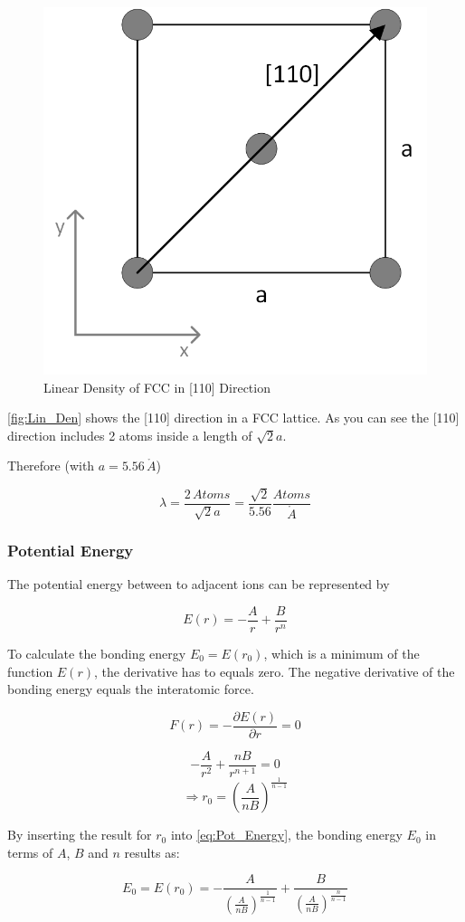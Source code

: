 \begin{figure}[H]
	\centering
	\includegraphics[width=0.5\linewidth]{Graphics/Chapter1/Lin_Den}
	\caption{Linear Density of FCC in [110] Direction}
	\label{fig:Lin_Den}
\end{figure}

\autoref{fig:Lin_Den} shows the [110] direction in a FCC lattice.
As you can see the [110] direction includes 2 atoms inside a 
length of $\sqrt{2}a$.

Therefore  (with $a = 5.56 \, \mathring{A}$)

$$\lambda = \frac{2 \, Atoms}{\sqrt{2}a} = \frac{\sqrt{2}}{5.56} \frac{Atoms}{\mathring{A}}$$

\subsubsection*{Potential Energy}

The potential energy between to adjacent ions can be represented by

\begin{equation}
	E(r) = - \frac{A}{r} + \frac{B}{r^n}
	\label{eq:Pot_Energy}
\end{equation}


To calculate the bonding energy $E_0 = E(r_0)$, which is a minimum of the function $E(r)$,
the derivative has to equals zero.
The negative derivative of the bonding energy equals the interatomic force.

$$F(r) = - \frac{\partial E(r)}{\partial r} = 0$$

$$-\frac{A}{r^2} + \frac{nB}{r^{n+1}} = 0$$
$$\Rightarrow r_0 = \left( \frac{A}{nB} \right)^{\frac{1}{n-1}}$$

By inserting the result for $r_0$ into \autoref{eq:Pot_Energy}, the bonding energy $E_0$ in terms of $A$, $B$ and $n$ results as:

$$E_0 = E(r_0) = - \frac{A}{\left( \frac{A}{nB} \right)^{\frac{1}{n-1}}} + 
				\frac{B}{\left( \frac{A}{nB} \right)^{\frac{n}{n-1}}}$$

